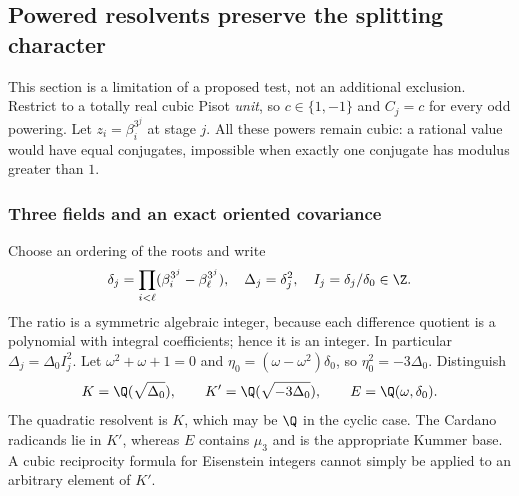 \documentclass[11pt,a4paper]{article}
\theoremstyle{definition}\newtheorem{definition}[theorem]{Definition}
\theoremstyle{remark}\newtheorem{remark}[theorem]{Remark}
\begin{document}
\subsection{Powered resolvents preserve the splitting character}

This section is a limitation of a proposed test, not an additional
exclusion. Restrict to a totally real cubic Pisot \emph{unit}, so
$c\in\{1,-1\}$ and $C_j=c$ for every odd powering. Let
$z_i=\beta_i^{3^j}$ at stage $j$. All these powers remain cubic:
a rational value would have equal conjugates, impossible when exactly
one conjugate has modulus greater than $1$.

\subsubsection{Three fields and an exact oriented covariance}

Choose an ordering of the roots and write
\[
 \delta_j=\prod_{i<\ell}(\beta_i^{3^j}-\beta_\ell^{3^j}),\quad
 \Delta_j=\delta_j^2,\quad I_j=\delta_j/\delta_0\in\Z.
\]
The ratio is a symmetric algebraic integer, because each difference
quotient is a polynomial with integral coefficients; hence it is an
integer. In particular $\Delta_j=\Delta_0I_j^2$.
Let $\omega^2+\omega+1=0$ and
$\eta_0=(\omega-\omega^2)\delta_0$, so $\eta_0^2=-3\Delta_0$.
Distinguish
\[
 K=\Q(\sqrt{\Delta_0}),\qquad
 K'=\Q(\sqrt{-3\Delta_0}),\qquad E=\Q(\omega,\delta_0).
\]
The quadratic resolvent is $K$, which may be $\Q$ in the cyclic case.
The Cardano radicands lie in $K'$, whereas $E$ contains $\mu_3$ and
is the appropriate Kummer base. A cubic reciprocity formula for
Eisenstein integers cannot simply be applied to an arbitrary element
of $K'$.
\end{document}
